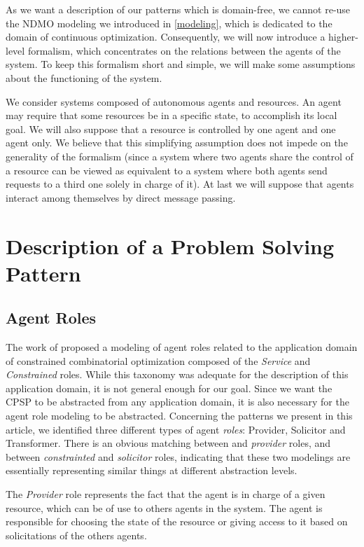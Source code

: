 As we want a description of our patterns which is domain-free, we cannot re-use the NDMO modeling we introduced in \ref{modeling}, which is dedicated to the domain of continuous optimization. Consequently, we will now introduce a higher-level formalism, which concentrates on the relations between the agents of the system. To keep this formalism short and simple, we will make some assumptions about the functioning of the system.

We consider systems composed of autonomous agents and resources. An agent may require that some resources be in a specific state, to accomplish its local goal. We will also suppose that a resource is controlled by one agent and one agent only. We believe that this simplifying assumption does not impede on the generality of the formalism (since a system where two agents share the control of a resource can be viewed as equivalent to a system where both agents send requests to a third one solely in charge of it). At last we will suppose that agents interact among themselves by direct message passing.

\section{Description of a Problem Solving Pattern}

\subsection{Agent Roles}\label{CPSP_roles}

The work of \cite{Ka2011.6} proposed a modeling of agent roles related to the application domain of constrained combinatorial optimization composed of the \emph{Service} and \emph{Constrained} roles. While this taxonomy was adequate for the description of this application domain, it is not general enough for our goal. Since we want the CPSP to be abstracted from any application domain, it is also necessary for the agent role modeling to be abstracted. Concerning the patterns we present in this article, we identified three different types of agent \emph{roles}: Provider, Solicitor and Transformer. There is an obvious matching between  and \emph{provider} roles, and between \emph{constrainted} and \emph{solicitor} roles, indicating that these two modelings are essentially representing similar things at different abstraction levels.

The \emph{Provider} role represents the fact that the agent is in charge of a given resource, which can be of use to others agents in the system. The agent is responsible for choosing the state of the resource or giving access to it based on solicitations of the others agents.

